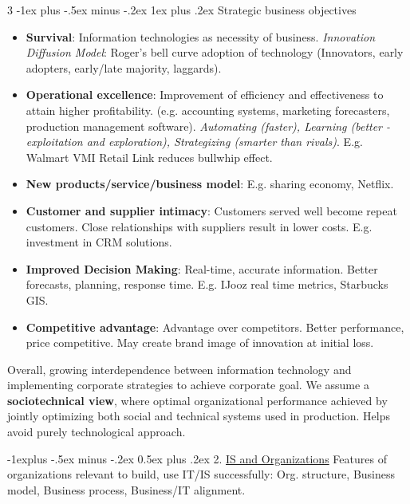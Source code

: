 \documentclass[10pt, landscape]{article}
\makeatletter
\renewcommand{\subsection}{\@startsection{subsection}{2}{0mm}%
                                {-1explus -.5ex minus -.2ex}%
                                {0.5ex plus .2ex}%
                                {\normalfont\normalsize\bfseries}}
\renewcommand{\subsubsection}{\@startsection{subsubsection}{3}{0mm}%
                                {-1ex plus -.5ex minus -.2ex}%
                                {1ex plus .2ex}%
                                {\normalfont\small\bfseries}}
\makeatother
\begin{document}
\begin{multicols*}{3}
\subsubsection{Strategic business objectives}
\begin{itemize}
\item \textbf{Survival}: Information technologies as necessity of business. \textit{Innovation Diffusion Model}: Roger’s bell curve adoption of technology (Innovators, early adopters, early/late majority, laggards).
\item \textbf{Operational excellence}: Improvement of efficiency and effectiveness to attain higher profitability. (e.g. accounting systems, marketing forecasters, production management software). \textit{Automating (faster), Learning (better - exploitation and exploration), Strategizing (smarter than rivals)}. E.g. Walmart VMI Retail Link reduces bullwhip effect.
\item \textbf{New products/service/business model}: E.g. sharing economy, Netflix.
\item \textbf{Customer and supplier intimacy}:  Customers served well become repeat customers. Close relationships with suppliers result in lower costs. E.g. investment in CRM solutions.
\item \textbf{Improved Decision Making}: Real-time, accurate information. Better forecasts, planning, response time. E.g. IJooz real time metrics, Starbucks GIS.
\item \textbf{Competitive advantage}: Advantage over competitors. Better performance, price competitive. May create brand image of innovation at initial loss. 
\end{itemize}

Overall, growing interdependence between information technology and implementing corporate strategies to achieve corporate goal. We assume a \textbf{sociotechnical view}, where optimal organizational performance achieved by jointly optimizing both social and 
technical systems used in production. Helps avoid purely technological approach.

\subsection{2. \underline{IS and Organizations}}
Features of organizations relevant to build, use IT/IS successfully: Org. structure, Business model, Business process, Business/IT alignment.


\end{multicols*}
\end{document}
